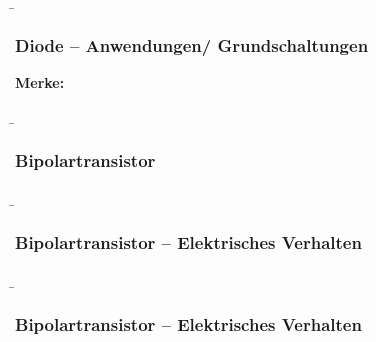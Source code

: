 \begin{frame}
    \b{\frametitle{Diode -- Anwendungen/ Grundschaltungen}
        \textbf{Merke:}
        \begin{itemize}
        \end{itemize}
        }
\end{frame}

\begin{frame}
    \b{ \frametitle{Bipolartransistor}
    \begin{figure}[H]
        \centering
        \scalebox{0.8}{}
    \end{figure}
    }
\end{frame}

\begin{frame}
    \b{ \frametitle{Bipolartransistor -- Elektrisches Verhalten}
        \begin{figure}[H]
            \centering
            
        \end{figure}
    }
\end{frame}

\begin{frame}
    \b{ \frametitle{Bipolartransistor -- Elektrisches Verhalten}
        \begin{figure}[H]
            \centering
            
        \end{figure}
    }
\end{frame}

